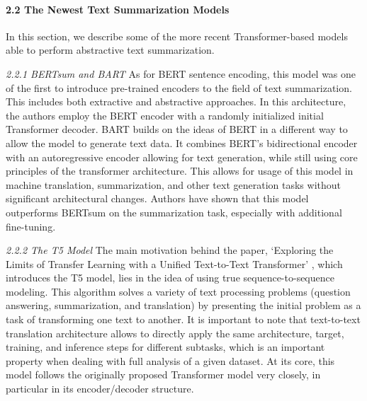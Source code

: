 \paragraph{2.2 The Newest Text Summarization Models}
In this section, we describe some of the more recent Transformer-based models able to perform abstractive text summarization.

\textit{2.2.1 BERTsum and BART}
As for BERT \cite{DevlinChangLee} sentence encoding, this model was one of the first to introduce pre-trained encoders to the field of text summarization. This includes both extractive and abstractive approaches. In this architecture, the authors employ the BERT encoder with a randomly initialized initial Transformer decoder. BART \cite{LewisLiuGoyal} builds on the ideas of BERT in a different way to allow the model to generate text data. It combines BERT’s bidirectional encoder with an autoregressive encoder allowing for text generation, while still using core principles of the transformer architecture. This allows for usage of this model in machine translation, summarization, and other text generation tasks without significant architectural changes. Authors have shown that this model outperforms BERTsum on the summarization task, especially with additional fine-tuning.

\textit{2.2.2 The T5 Model}
The main motivation behind the paper, ‘Exploring the Limits of Transfer Learning with a Unified Text-to-Text Transformer’ \cite{RaffelShazeerRoberts}, which introduces the T5 model, lies in the idea of using true sequence-to-sequence modeling. This algorithm solves a variety of text processing problems (question answering, summarization, and translation) by presenting the initial problem as a task of transforming one text to another. It is important to note that text-to-text translation architecture allows to directly apply the same architecture, target, training, and inference steps for different subtasks, which is an important property when dealing with full analysis of a given dataset. At its core, this model follows the originally proposed Transformer model very closely, in particular in its encoder/decoder structure.

